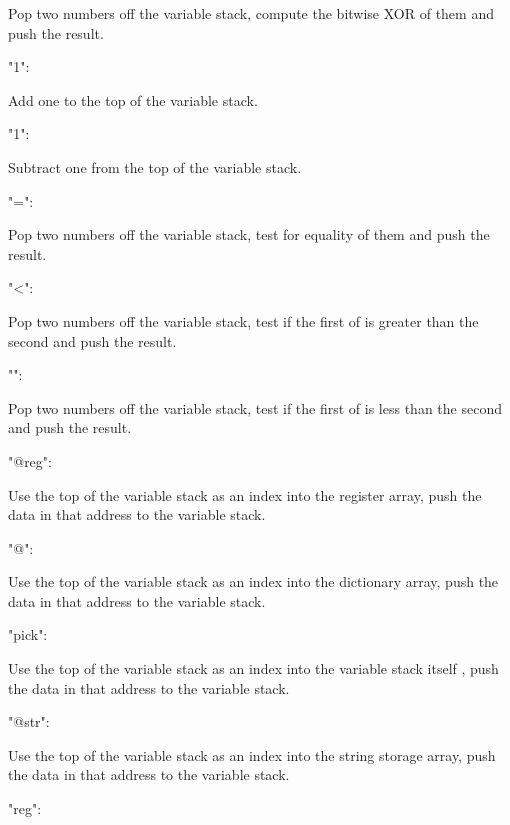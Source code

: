 Pop two numbers off the variable stack, compute the bitwise X\-O\-R of them and push the result. \begin{DoxyVerb}   "1\+":
\end{DoxyVerb}


Add one to the top of the variable stack. \begin{DoxyVerb}   "1\-":
\end{DoxyVerb}


Subtract one from the top of the variable stack. \begin{DoxyVerb}   "=":
\end{DoxyVerb}


Pop two numbers off the variable stack, test for equality of them and push the result. \begin{DoxyVerb}   "<":
\end{DoxyVerb}


Pop two numbers off the variable stack, test if the first of is greater than the second and push the result. \begin{DoxyVerb}   "\>":
\end{DoxyVerb}


Pop two numbers off the variable stack, test if the first of is less than the second and push the result. \begin{DoxyVerb}   "@reg":
\end{DoxyVerb}


Use the top of the variable stack as an index into the register array, push the data in that address to the variable stack. \begin{DoxyVerb}   "@":
\end{DoxyVerb}


Use the top of the variable stack as an index into the dictionary array, push the data in that address to the variable stack. \begin{DoxyVerb}   "pick":
\end{DoxyVerb}


Use the top of the variable stack as an index into the variable stack itself , push the data in that address to the variable stack. \begin{DoxyVerb}   "@str":
\end{DoxyVerb}


Use the top of the variable stack as an index into the string storage array, push the data in that address to the variable stack. \begin{DoxyVerb}   "\!reg":
\end{DoxyVerb}


